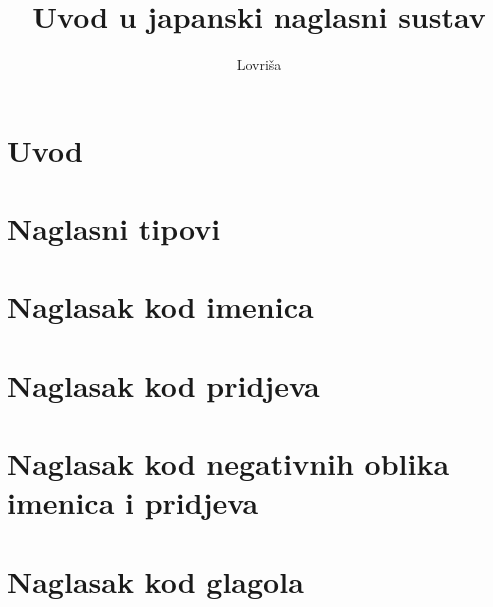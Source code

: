 \documentclass{template}
\title{Uvod u japanski naglasni sustav}
\author{Lovriša}
\begin{document}
	\onehalfspacing
	\begin{titlepage}
%		
%		
%		
		\maketitle
	\end{titlepage}
	\cleardoublepage
	\thispagestyle{empty}
	\tableofcontents
	\cleardoublepage
	

	\section{Uvod}
	
	
	\section{Naglasni tipovi}
	
	
	\section{Naglasak kod imenica}
	

	\section{Naglasak kod pridjeva}
	

	\section{Naglasak kod negativnih oblika imenica i pridjeva}
	

	\section{Naglasak kod glagola}
	
\end{document}
